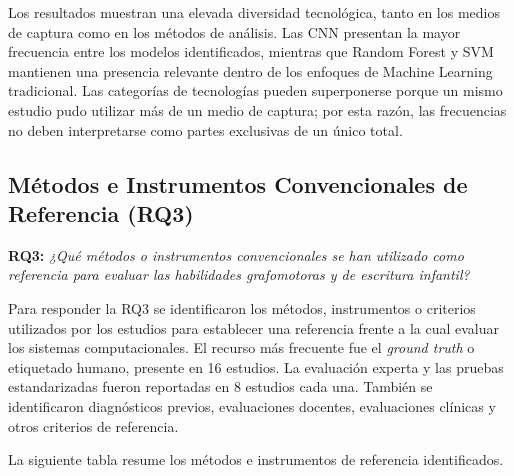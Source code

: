 \documentclass{iaesarticle}
\begin{document}
Los resultados muestran una elevada diversidad tecnológica, tanto en los medios de captura como en los métodos de análisis. Las CNN presentan la mayor frecuencia entre los modelos identificados, mientras que Random Forest y SVM mantienen una presencia relevante dentro de los enfoques de Machine Learning tradicional. Las categorías de tecnologías pueden superponerse porque un mismo estudio pudo utilizar más de un medio de captura; por esta razón, las frecuencias no deben interpretarse como partes exclusivas de un único total.

\FloatBarrier


\subsection{Métodos e Instrumentos Convencionales de Referencia (RQ3)}
\label{subsec:rq3}

\textbf{RQ3:} \textit{¿Qué métodos o instrumentos convencionales se han utilizado como referencia para evaluar las habilidades grafomotoras y de escritura infantil?}

Para responder la RQ3 se identificaron los métodos, instrumentos o criterios utilizados por los estudios para establecer una referencia frente a la cual evaluar los sistemas computacionales. El recurso más frecuente fue el \textit{ground truth} o etiquetado humano, presente en 16 estudios. La evaluación experta y las pruebas estandarizadas fueron reportadas en 8 estudios cada una. También se identificaron diagnósticos previos, evaluaciones docentes, evaluaciones clínicas y otros criterios de referencia.

La siguiente tabla resume los métodos e instrumentos de referencia identificados.
\end{document}
